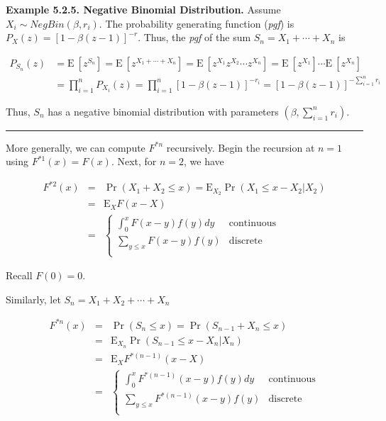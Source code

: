 \documentclass[]{book}
\theoremstyle{definition}
\theoremstyle{definition}
\theoremstyle{definition}
\theoremstyle{remark}
\begin{document}
\textbf{Example 5.2.5. Negative Binomial Distribution.} Assume
\(X_i \sim NegBin(\beta, r_i)\). The probability generating function
(\emph{pgf}) is \(P_X(z) = \left[1-\beta(z-1) \right]^{-r}\). Thus, the
\emph{pgf} of the sum \(S_n =X_1+\cdots+X_n\) is

\[\begin{aligned}
P_{S_n}(z) &= \mathrm{E~}\left[ z^{S_n} \right] = \mathrm{E~}\left[ z^{X_1+\cdots+X_n} \right] = \mathrm{E~}\left[ z^{X_1} z^{X_2} \cdots z^{X_n} \right] = \mathrm{E~}\left[z^{X_1}\right] \cdots \mathrm{E~}\left[z^{X_n}\right] \\
&= \prod_{i=1}^n P_{X_i}(z) = \prod_{i=1}^n \left[1-\beta(z-1) \right]^{-r_i} = \left[1-\beta(z-1) \right]^{-\sum_{i=1}^n r_i}
\end{aligned}\]

Thus, \(S_n\) has a negative binomial distribution with parameters
\((\beta, \sum_{i=1}^n r_i)\).

\begin{center}\rule{0.5\linewidth}{\linethickness}\end{center}

More generally, we can compute \(F^{\ast n}\) recursively. Begin the
recursion at \(n=1\) using \(F^{\ast 1} \left(x \right) =F(x)\). Next,
for \(n=2\), we have

\begin{eqnarray*}
F^{\ast 2} \left(x \right) &=& \Pr(X_1 + X_2 \le x) = \mathrm{E}_{X_2} \Pr(X_1 \le x - X_2|X_2)\\
&=& \mathrm{E}_X F(x - X)\\
&=&\left\{\begin{array}{ll}
\int_{0}^{x} F(x-y) f(y) dy & \text{continuous}\\
\sum_{y \le x} F(x-y) f(y) & \text{discrete}\\
\end{array}\right.
\end{eqnarray*}

Recall \(F(0) = 0\).

Similarly, let \(S_n = X_1 + X_2 + \cdots + X_n\)

\begin{eqnarray*}
F^{\ast n}\left(x\right) &=& \Pr(S_n \le x) = \Pr(S_{n-1} + X_n \le x)\\
&=&\mathrm{E}_{X_n}\Pr(S_{n-1} \le x - X_n|X_n)\\
&=&\mathrm{E}_X F^{\ast(n-1)}(x - X)\\
&=& 
\left\{\begin{array}{ll}
\int_{0}^{x} F^{\ast(n-1)}(x-y)f(y)dy & \text{continuous}\\
\sum_{y \le x} F^{\ast(n-1)}(x-y)f(y) & \text{discrete}\\
\end{array}\right.
\end{eqnarray*}
\end{document}
